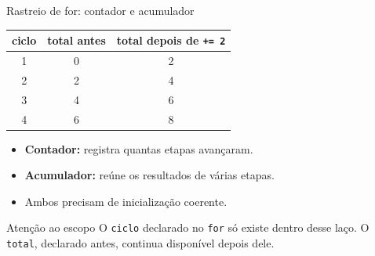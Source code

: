 \begin{frame}{Rastreio de for: contador e acumulador}
\begin{center}
\begin{tabular}{ccc}
\toprule
ciclo & total antes & total depois de \texttt{+= 2} \\
\midrule
1 & 0 & 2 \\
2 & 2 & 4 \\
3 & 4 & 6 \\
4 & 6 & 8 \\
\bottomrule
\end{tabular}
\end{center}
\begin{itemize}
\item \textbf{Contador:} registra quantas etapas avançaram.
\item \textbf{Acumulador:} reúne os resultados de várias etapas.
\item Ambos precisam de inicialização coerente.
\end{itemize}
\begin{alertblock}{Atenção ao escopo}
O \texttt{ciclo} declarado no \texttt{for} só existe dentro desse laço. O \texttt{total}, declarado antes, continua disponível depois dele.
\end{alertblock}
\end{frame}
